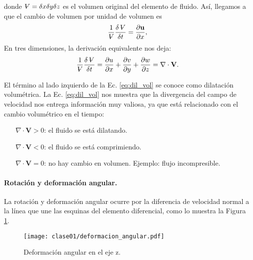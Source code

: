 %
donde $\vol = \delta x\delta y\delta z$ es el volumen original del elemento de fluido.
Así, llegamos a que el cambio de volumen por unidad de volumen es
%
\begin{equation}
\frac{1}{\vol}\frac{\delta \vol}{\delta t} = \frac{\partial \mathbf{u}}{\partial x},
\end{equation}
%
En tres dimensiones, la derivación equivalente nos deja:
%
\begin{equation}\label{eq:dil_vol} 
\frac{1}{\vol}\frac{\delta \vol}{\delta t} = \frac{\partial u}{\partial x} +\frac{\partial v}{\partial y} +\frac{\partial w}{\partial z}  = \nabla \cdot \mathbf{V}.
\end{equation}

El término al lado izquierdo de la Ec. \eqref{eq:dil_vol} se conoce como dilatación volumétrica.
La Ec. \eqref{eq:dil_vol} nos muestra que la divergencia del campo de velocidad nos entrega información muy valiosa, ya que está relacionado con el cambio volumétrico en el tiempo:
%
\begin{itemize}
\item[$\nabla \cdot \mathbf{V} > 0$:] el fluido se está dilatando. 
\item[$\nabla \cdot \mathbf{V} < 0$:] el fluido se está comprimiendo. 
\item[$\nabla \cdot \mathbf{V} = 0$:] no hay cambio en volumen. Ejemplo: flujo incompresible. 
\end{itemize}

\paragraph{Rotación y deformación angular.}
La rotación y deformación angular ocurre por la diferencia de velocidad normal a la línea que une las esquinas del elemento diferencial, como lo muestra la Figura \ref{fig:deformacion_angular}.

\begin{figure}[h!]
\centering
\texttt{[image: clase01/deformacion\_angular.pdf]}
\caption{Deformación angular en el eje z.}
\label{fig:deformacion_angular}
\end{figure}

